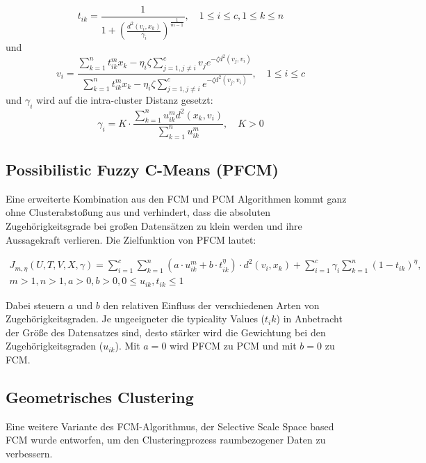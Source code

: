 \documentclass[11pt,ceqn]{book}
\begin{document}
$$t_{ik} = \frac{1}{1+\left(\frac{d^2(v_i,x_k)}{\gamma_i}\right)^{\frac{1}{m-1}}},\quad 1\leqslant i \leqslant c, 1\leqslant k\leqslant n$$
und
$$v_i = \frac{\sum\limits_{k=1}^n t_{ik}^m x_k - \eta_i \zeta \sum\limits_{j=1,j\neq i}^c v_j e^{-\zeta d^2(v_j,v_i)}}{\sum\limits_{k=1}^n t_{ik}^m x_k - \eta_i \zeta \sum\limits_{j=1,j\neq i}^c e^{-\zeta d^2(v_j,v_i)}},\quad 1\leqslant i \leqslant c$$
und $\gamma_i$ wird auf die intra-cluster Distanz gesetzt:
$$\gamma_i = K\cdot \frac{\sum\limits_{k=1}^n u_{ik}^m d^2 (x_k, v_i)}{\sum\limits_{k=1}^n u_{ik}^m},\quad K>0$$

\subsection{Possibilistic Fuzzy C-Means (PFCM)}
Eine erweiterte Kombination aus den FCM und PCM Algorithmen kommt ganz ohne Clusterabstoßung aus und verhindert, dass die absoluten Zugehörigkeitsgrade bei großen Datensätzen zu klein werden und ihre Aussagekraft verlieren. Die Zielfunktion von PFCM\cite{pfcmpaper} lautet:

\begin{equation}
\begin{split}
J_{m,\eta}(U,T,V,X,\gamma) = \sum_{i=1}^{c} \sum_{k=1}^{n} \left(a\cdot u_{ik}^m + b\cdot t_{ik}^{\eta}\right)\cdot d^2(v_i,x_k) + \sum_{i=1}^c  \gamma_i \sum_{k=1}^n (1-t_{ik})^{\eta}, \\ m>1, n>1,a>0, b>0, 0\leqslant u_{ik}, t_{ik} \leqslant 1
\end{split}
\end{equation}

Dabei steuern $a$ und $b$ den relativen Einfluss der verschiedenen Arten von Zugehörigkeitsgraden. Je ungeeigneter die typicality Values ($t_ik$) in Anbetracht der Größe des Datensatzes sind, desto stärker wird die Gewichtung bei den Zugehörigkeitsgraden ($u_{ik}$). Mit $a=0$ wird PFCM zu PCM und mit $b=0$ zu FCM.

\subsection{Geometrisches Clustering}
Eine weitere Variante des FCM-Algorithmus, der Selective Scale Space based FCM wurde entworfen, um den Clusteringprozess raumbezogener Daten zu verbessern. 
\end{document}
